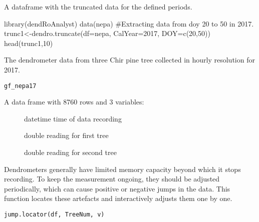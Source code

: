 \documentclass[a4paper]{book}
\begin{document}
%
\begin{Value}
A dataframe with the truncated data for the defined periods.
\end{Value}
%
\begin{Examples}
\begin{ExampleCode}
library(dendRoAnalyst)
data(nepa)
#Extracting data from doy 20 to 50 in 2017.
trunc1<-dendro.truncate(df=nepa, CalYear=2017, DOY=c(20,50))
head(trunc1,10)

\end{ExampleCode}
\end{Examples}
%
\begin{Description}\relax
The dendrometer data from three Chir pine tree collected in hourly resolution for 2017.
\end{Description}
%
\begin{Usage}
\begin{verbatim}
gf_nepa17
\end{verbatim}
\end{Usage}
%
\begin{Format}
A data frame with 8760 rows and 3 variables:
\begin{description}

\item[] datetime time of data recording
\item[] double reading for first tree
\item[] double reading for second tree

\end{description}

\end{Format}
%
\begin{Description}\relax
Dendrometers generally have limited memory capacity beyond which it stops recording. To keep the measurement ongoing, they should be adjusted periodically, which can cause positive or negative jumps in the data. This function locates these artefacts and interactively adjusts them one by one.
\end{Description}
%
\begin{Usage}
\begin{verbatim}
jump.locator(df, TreeNum, v)
\end{verbatim}
\end{Usage}
\end{document}
